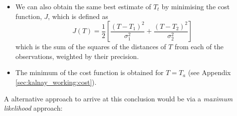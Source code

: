\begin{itemize}
    \item We can also obtain the same best estimate of $T_t$ by minimising the cost function, $J$, which is defined as
    \begin{equation}
        J(T) = \frac{1}{2} \left[ \frac{\left( T - T_1 \right)^2}{\sigma_1^2} + \frac{\left( T - T_2 \right)^2}{\sigma_2^2} \right] \label{eq:cost_function}
    \end{equation}
    which is the sum of the squares of the distances of $T$ from each of the observations, weighted by their precision.
    \item The minimum of the cost function is obtained for $T = T_a$ (see Appendix \ref{sec:kalnay_working:cost}).
\end{itemize}
A alternative approach to arrive at this conclusion would be via a \emph{maximum likelihood} approach:
